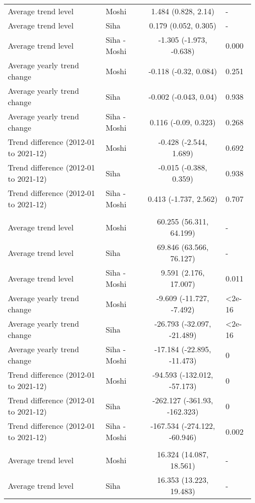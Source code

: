 \begin{longtable}{l|lcl}
\midrule\addlinespace[2.5pt]
\multicolumn{4}{l}{Leprosy} \\ 
\midrule\addlinespace[2.5pt]
Average trend level & Moshi & 1.484 (0.828, 2.14) & - \\ 
Average trend level & Siha & 0.179 (0.052, 0.305) & - \\ 
Average trend level & Siha - Moshi & -1.305 (-1.973, -0.638) & 0.000 \\ 
Average yearly trend change & Moshi & -0.118 (-0.32, 0.084) & 0.251 \\ 
Average yearly trend change & Siha & -0.002 (-0.043, 0.04) & 0.938 \\ 
Average yearly trend change & Siha - Moshi & 0.116 (-0.09, 0.323) & 0.268 \\ 
Trend difference (2012-01 to 2021-12) & Moshi & -0.428 (-2.544, 1.689) & 0.692 \\ 
Trend difference (2012-01 to 2021-12) & Siha & -0.015 (-0.388, 0.359) & 0.938 \\ 
Trend difference (2012-01 to 2021-12) & Siha - Moshi & 0.413 (-1.737, 2.562) & 0.707 \\ 
\midrule\addlinespace[2.5pt]
\multicolumn{4}{l}{Malaria} \\ 
\midrule\addlinespace[2.5pt]
Average trend level & Moshi & 60.255 (56.311, 64.199) & - \\ 
Average trend level & Siha & 69.846 (63.566, 76.127) & - \\ 
Average trend level & Siha - Moshi & 9.591 (2.176, 17.007) & 0.011 \\ 
Average yearly trend change & Moshi & -9.609 (-11.727, -7.492) & <2e-16 \\ 
Average yearly trend change & Siha & -26.793 (-32.097, -21.489) & <2e-16 \\ 
Average yearly trend change & Siha - Moshi & -17.184 (-22.895, -11.473) & 0 \\ 
Trend difference (2012-01 to 2021-12) & Moshi & -94.593 (-132.012, -57.173) & 0 \\ 
Trend difference (2012-01 to 2021-12) & Siha & -262.127 (-361.93, -162.323) & 0 \\ 
Trend difference (2012-01 to 2021-12) & Siha - Moshi & -167.534 (-274.122, -60.946) & 0.002 \\ 
\midrule\addlinespace[2.5pt]
\multicolumn{4}{l}{Neoplasms/Cancer} \\ 
\midrule\addlinespace[2.5pt]
Average trend level & Moshi & 16.324 (14.087, 18.561) & - \\ 
Average trend level & Siha & 16.353 (13.223, 19.483) & - \\ 

\end{longtable}
